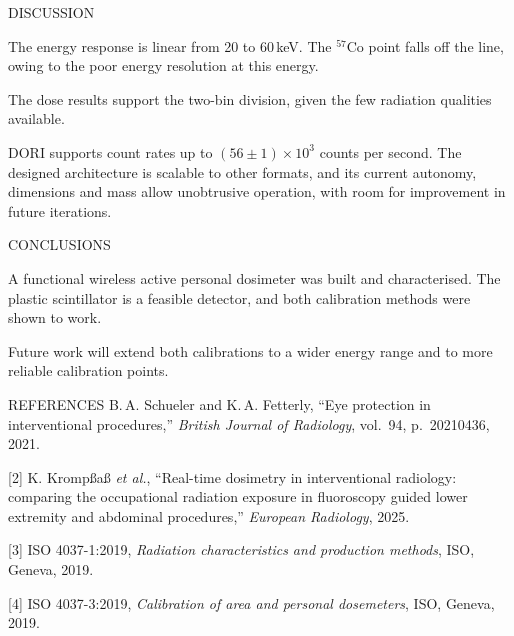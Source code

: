 \documentclass{article}
\newcommand{\reffont}     {\fontsize{22}{26}\selectfont}   %
\newlength{\colgap}\setlength{\colgap}{1.6cm}           %
\newlength{\colC}  \setlength{\colC}{\textwidth}
\newlength{\rowgap}   \setlength{\rowgap}{1.6cm}    %
\newlength{\rowtwohgt}\setlength{\rowtwohgt}{\textheight}
\newlength{\dishgt}\setlength{\dishgt}{24.5cm}
\newlength{\refhgt}\setlength{\refhgt}{15.5cm}
\newlength{\conhgt}\setlength{\conhgt}{\rowtwohgt}
\newcommand{\topcol}{\vspace{0pt}}
\newcommand{\blockgap}{\par\vspace{\dimexpr\rowgap-\baselineskip\relax}}
\begin{document}
\hspace{\colgap}%
\begin{minipage}[t]{\colC}\topcol

  \begin{doriblock}[height=\dishgt]{DISCUSSION}

    The energy response is linear from 20 to 60\,keV. The $^{57}$Co point falls
    off the line, owing to the poor energy resolution at this energy.

    The dose results support the two-bin division, given the few radiation
    qualities available.

    DORI supports count rates up to $(56 \pm 1) \times 10^{3}$ counts per second.
    The designed architecture is scalable to other formats, and its current
    autonomy, dimensions and mass allow unobtrusive operation, with room for
    improvement in future iterations.

  \end{doriblock}

  \blockgap

  \begin{doriblock}[height=\conhgt]{CONCLUSIONS}

    A functional wireless active personal dosimeter was built and characterised.
    The plastic scintillator is a feasible detector, and both calibration methods
    were shown to work.

    Future work will extend both calibrations to a wider energy range and to more
    reliable calibration points.

  \end{doriblock}

  \blockgap

  \begin{doriblock}[height=\refhgt]{REFERENCES}
    \reffont
  [1] B.\,A. Schueler and K.\,A. Fetterly, ``Eye protection in interventional
procedures,'' \emph{British Journal of Radiology}, vol.~94, p.~20210436, 2021.
 
[2] K. Kromp\ss{}a\ss{} \emph{et al.}, ``Real-time dosimetry in interventional
radiology: comparing the occupational radiation exposure in fluoroscopy guided
lower extremity and abdominal procedures,'' \emph{European Radiology}, 2025.\

[3] ISO 4037-1:2019, \emph{Radiation characteristics and production methods},
ISO, Geneva, 2019.\

[4] ISO 4037-3:2019, \emph{Calibration of area and personal dosemeters},
ISO, Geneva, 2019.\

  \end{doriblock}

\end{minipage}
\end{document}
